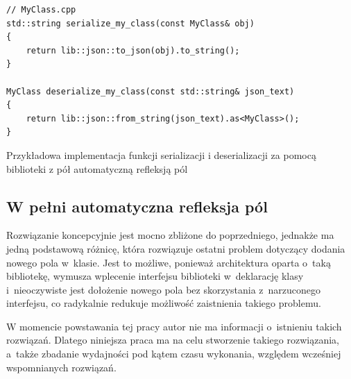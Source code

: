 \documentclass[12pt]{article}
\newcommand{\n}{\newline}
\begin{document}
{{{\begin{captioned}[H]
\begin{lstlisting}[frame=single]
// MyClass.cpp
std::string serialize_my_class(const MyClass& obj)
{
	return lib::json::to_json(obj).to_string();
}

MyClass deserialize_my_class(const std::string& json_text)
{
	return lib::json::from_string(json_text).as<MyClass>();
}
					\end{lstlisting}
					\caption{Przykładowa implementacja funkcji serializacji i deserializacji za pomocą biblioteki z pół automatyczną refleksją pól}
					\label{half_automatic_example}
				\end{captioned}
			}
		}

		{
			\subsection{W pełni automatyczna refleksja pól}

			Rozwiązanie koncepcyjnie jest mocno zbliżone do poprzedniego, jednakże ma jedną podstawową różnicę, która rozwiązuje ostatni
			problem dotyczący dodania nowego pola w~klasie. Jest to możliwe, ponieważ architektura oparta o~taką bibliotekę, wymusza wplecenie
			interfejsu biblioteki w~deklarację klasy i~nieoczywiste jest dołożenie nowego pola bez skorzystania z~narzuconego interfejsu, co
			radykalnie redukuje możliwość zaistnienia takiego problemu.\n

			W momencie powstawania tej pracy autor nie ma informacji o~istnieniu takich rozwiązań. Dlatego niniejsza praca ma na celu
			stworzenie takiego rozwiązania, a~także zbadanie wydajności pod kątem czasu wykonania, względem wcześniej wspomnianych rozwiązań.
		}
	}
\end{document}
